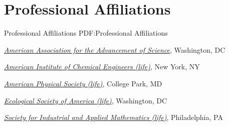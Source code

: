\section
{Professional Affiliations} 
{Professional Affiliations}
{PDF:Professional Affiliations}

\href{http://www.aaas.org/}
{\textit{American Association for the Advancement of Science}},
Washington, DC

\Gap
\href{http://www.aiche.org/}
{\textit{American Institute of Chemical Engineers (life)}},
New York, NY

\Gap
\href{http://www.aps.org/}
{\textit{American Physical Society (life)}},
College Park, MD

\Gap
\href{http://www.esa.org/esa/}
{\textit{Ecological Society of America (life)}},
Washington, DC

\Gap
\href{http://siam.org/}
{\textit{Society for Industrial and Applied Mathematics (life)}},
Philadelphia, PA

\Gap

